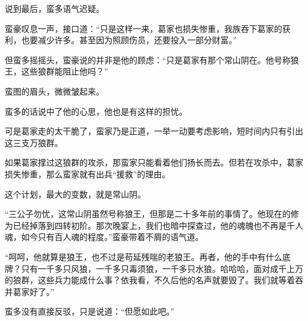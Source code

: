\begin{this_body}
说到最后，蛮多语气迟疑。

蛮豪叹息一声，接口道：“只是这样一来，葛家也损失惨重，我族吞下葛家的获利，也要减少许多。甚至因为照顾伤员，还要投入一部分财富。”

但蛮多摇摇头，蛮豪说的并非是他的顾虑：“只是葛家有那个常山阴在。他号称狼王，这些狼群能阻止他吗？”

蛮图的眉头，微微皱起来。

蛮多的话说中了他的心思，他也是有这样的担忧。

可是葛家走的太干脆了，蛮家乃是正道，一举一动要考虑影响，短时间内只有引出这三支万狼群。

如果葛家撑过这狼群的攻杀，那蛮家只能看着他们扬长而去。但若在攻杀中，葛家损失惨重，那么蛮家就有出兵“援救”的理由。

这个计划，最大的变数，就是常山阴。

“三公子勿忧，这常山阴虽然号称狼王，但那是二十多年前的事情了。他现在的修为已经掉落到四转初阶。那次晚宴上，我们也暗中探查过，他的魂魄也不再是千人魂，如今只有百人魂的程度。”蛮豪带着不屑的语气道。

“呵呵，他就算是狼王，也不过是苟延残喘的老狼王。再者，他的手中有什么底牌？只有一千多只风狼，一千多只毒须狼，一千多只水狼。哈哈哈，面对成千上万的狼群，这些兵力能成什么事？依我看，不久后他的名声就要毁了。我们就等着吞并葛家好了。”

蛮多没有直接反驳，只是说道：“但愿如此吧。”

\end{this_body}

